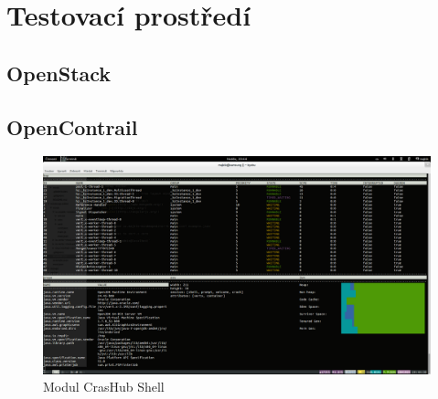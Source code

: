 \chapter{Testovací prostředí}

\section{OpenStack}\label{sub:interaction}

\section{OpenContrail}\label{sub:interaction}


\begin{figure}[h]
\begin{centering}
\includegraphics[scale=0.21]{images/real_interaction}
\par\end{centering}
\caption{Modul CrasHub Shell\label{fig:real_interaction}}
\end{figure}
